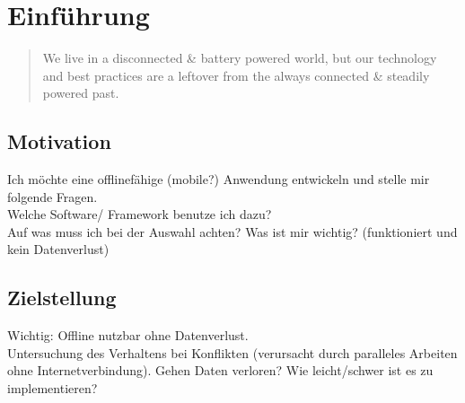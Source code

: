 \chapter{\label{chap:einleitung}Einführung}
\begin{quote}
  We live in a disconnected \& battery powered world, but our technology and best practices are a leftover from the always connected \& steadily powered past.
  \cite{offlinefirst}
\end{quote}

\section{Motivation}
Ich möchte eine offlinefähige (mobile?) Anwendung entwickeln und stelle mir folgende Fragen. \\
Welche Software/ Framework benutze ich dazu?\\
Auf was muss ich bei der Auswahl achten? Was ist mir wichtig? (funktioniert und kein Datenverlust)
\section{Zielstellung}
Wichtig: Offline nutzbar ohne Datenverlust.\\
Untersuchung des Verhaltens bei  Konflikten (verursacht durch paralleles Arbeiten ohne Internetverbindung). Gehen Daten verloren? Wie leicht/schwer ist es zu implementieren?
